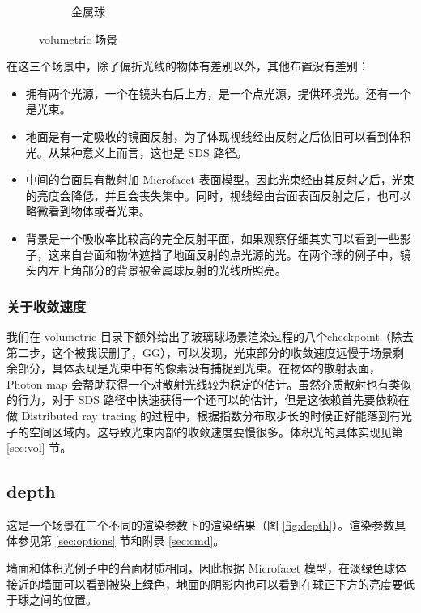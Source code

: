 \documentclass{ctexart}
\begin{document}
\begin{figure}[ht]
\begin{subfigure}{.3\textwidth}
    \caption{金属球}
  \end{subfigure}
  \caption{volumetric 场景}
  \label{fig:vol}
\end{figure}

在这三个场景中，除了偏折光线的物体有差别以外，其他布置没有差别：
\begin{itemize}
  \item 拥有两个光源，一个在镜头右后上方，是一个点光源，提供环境光。还有一个是光束。
  \item 地面是有一定吸收的镜面反射，为了体现视线经由反射之后依旧可以看到体积光。从某种意义上而言，这也是 SDS 路径。
  \item 中间的台面具有散射加 Microfacet 表面模型。因此光束经由其反射之后，光束的亮度会降低，并且会丧失集中。同时，视线经由台面表面反射之后，也可以略微看到物体或者光束。
  \item 背景是一个吸收率比较高的完全反射平面，如果观察仔细其实可以看到一些影子，这来自台面和物体遮挡了地面反射的点光源的光。在两个球的例子中，镜头内左上角部分的背景被金属球反射的光线所照亮。
\end{itemize}

\subsubsection{关于收敛速度}
我们在 volumetric 目录下额外给出了玻璃球场景渲染过程的八个checkpoint（除去第二步，这个被我误删了，GG），可以发现，光束部分的收敛速度远慢于场景剩余部分，具体表现是光束中有的像素没有捕捉到光束。在物体的散射表面，Photon map 会帮助获得一个对散射光线较为稳定的估计。虽然介质散射也有类似的行为，对于 SDS 路径中快速获得一个还可以的估计，但是这依赖首先要依赖在做 Distributed ray tracing 的过程中，根据指数分布取步长的时候正好能落到有光子的空间区域内。这导致光束内部的收敛速度要慢很多。体积光的具体实现见第 \ref{sec:vol} 节。
\subsection{depth}
这是一个场景在三个不同的渲染参数下的渲染结果（图 \ref{fig:depth}）。渲染参数具体参见第 \ref{sec:options} 节和附录 \ref{sec:cmd}。

墙面和体积光例子中的台面材质相同，因此根据 Microfacet 模型，在淡绿色球体接近的墙面可以看到被染上绿色，地面的阴影内也可以看到在球正下方的亮度要低于球之间的位置。
\end{document}
